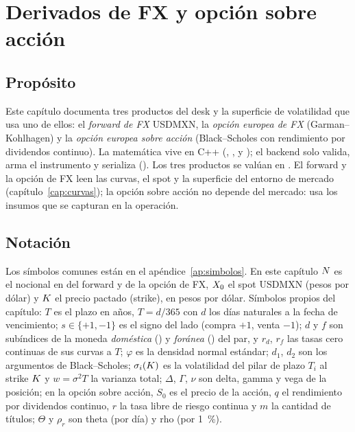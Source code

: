 \chapter{Derivados de FX y opción sobre acción}\label{cap:fx}

\section{Propósito}\label{sec:cap04-proposito}

Este capítulo documenta tres productos del desk y la superficie de volatilidad que usa uno de ellos: el
\emph{forward de FX} USDMXN, la \emph{opción europea de FX} (Garman--Kohlhagen) y la \emph{opción europea
sobre acción} (Black--Scholes con rendimiento por dividendos continuo). La matemática vive en C++
(,
,
 y
); el backend solo valida, arma el instrumento y
serializa (). Los tres productos se valúan en \MXN{}. El forward y la
opción de FX leen las curvas, el spot y la superficie del entorno de mercado
(capítulo~\ref{cap:curvas}); la opción sobre acción no depende del mercado: usa los insumos que se capturan en
la operación.

\section{Notación}\label{sec:cap04-notacion}

Los símbolos comunes están en el apéndice~\ref{ap:simbolos}. En este capítulo $N$ es el nocional en
\USD{} del forward y de la opción de FX, $X_0$ el spot USDMXN (pesos por dólar) y $K$ el precio pactado
(strike), en pesos por dólar. Símbolos propios del capítulo:
$T$ es el plazo en años, $T = d/365$ con $d$ los días naturales a la fecha de vencimiento;
$s\in\{+1,-1\}$ es el signo del lado (compra $+1$, venta $-1$);
$d$ y $f$ son subíndices de la moneda \emph{doméstica} (\MXN{}) y \emph{foránea} (\USD{}) del par, y $r_d$, $r_f$
las tasas cero continuas de sus curvas a $T$;
$\varphi$ es la densidad normal estándar;
$d_1$, $d_2$ son los argumentos de Black--Scholes;
$\sigma_i(K)$ es la volatilidad del pilar de plazo $T_i$ al strike $K$ y $w=\sigma^2T$ la varianza total;
$\Delta$, $\Gamma$, $\nu$ son delta, gamma y vega de la posición;
en la opción sobre acción, $S_0$ es el precio de la acción, $q$ el rendimiento por dividendos continuo, $r$ la
tasa libre de riesgo continua y $m$ la cantidad de títulos; $\Theta$ y $\rho_r$ son theta (por día) y rho (por
1~\%).

